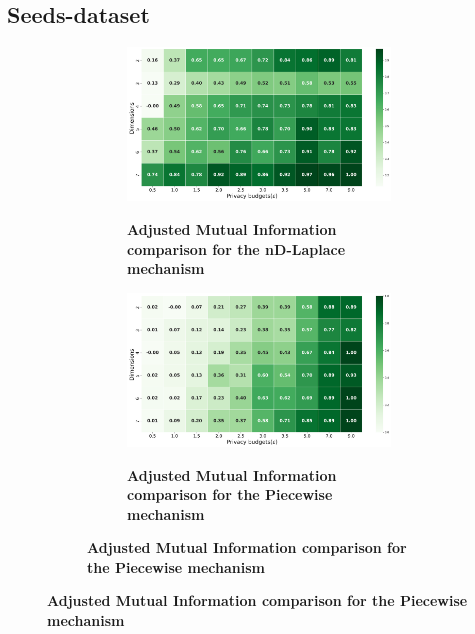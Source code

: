\subsection{Seeds-dataset}
\begin{figure}[H]
  \centering
  \begin{subfigure}[b]{0.8\textwidth}
    \begin{subfigure}[c]{1\textwidth}
      \caption{\textbf{Adjusted Mutual Information comparison for the nD-Laplace mechanism}}
      \includegraphics[width=1\textwidth]{Results/nd-laplace/nd-Laplace/seeds-dataset/ami.png}
      \label{fig:ami_seeds-dataset_comparison_kdlaplace_2d}
    \end{subfigure}
    \vfill %
    \begin{subfigure}[c]{1\textwidth}
      \caption{\textbf{Adjusted Mutual Information comparison for the Piecewise mechanism}}
      \includegraphics[width=1\textwidth]{Results/nd-laplace/piecewise/seeds-dataset/ami.png}
      \label{fig:ami_seeds-dataset_comparison_piecewise_2d}
    \end{subfigure}
  \end{subfigure}

\end{figure}
